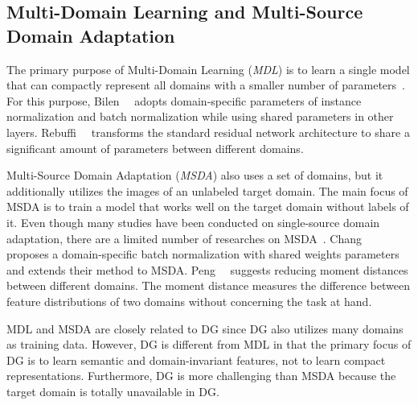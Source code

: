 \subsection{Multi-Domain Learning and Multi-Source Domain Adaptation}
The primary purpose of Multi-Domain Learning (\textit{MDL}) is to learn a single model that can compactly represent all domains with a smaller number of parameters~\cite{yang2015mdlmtl, Rebuffi17, Bilen17, Rebuffi18}. For this purpose, Bilen~\etal~\cite{Bilen17} adopts domain-specific parameters of instance normalization and batch normalization while using shared parameters in other layers. Rebuffi~\etal~\cite{Rebuffi17} transforms the standard residual network architecture to share a significant amount of parameters between different domains.

Multi-Source Domain Adaptation (\textit{MSDA}) also uses a set of domains, but it additionally utilizes the images of an unlabeled target domain. The main focus of MSDA is to train a model that works well on the target domain without labels of it. Even though many studies have been conducted on single-source domain adaptation, there are a limited number of researches on MSDA~\cite{Zhao2018NIPS, Chang2019cvpr, guo2018-multi, peng2018moment}. Chang~\etal~\cite{Chang2019cvpr} proposes a domain-specific batch normalization with shared weights parameters and extends their method to MSDA. Peng~\etal~\cite{peng2018moment} suggests reducing moment distances between different domains. The moment distance measures the difference between feature distributions of two domains without concerning the task at hand.

MDL and MSDA are closely related to DG since DG also utilizes many domains as training data. However, DG is different from MDL in that the primary focus of DG is to learn semantic and domain-invariant features, not to learn compact representations. Furthermore, DG is more challenging than MSDA because the target domain is totally unavailable in DG.


